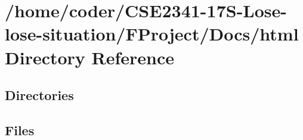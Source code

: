 \section{/home/coder/\+C\+S\+E2341-\/17\+S-\/\+Lose-\/lose-\/situation/\+F\+Project/\+Docs/html Directory Reference}
\label{dir_1db84d1af81ec941ad0c5d401eba4310}
\subsection*{Directories}
\begin{DoxyCompactItemize}
\end{DoxyCompactItemize}
\subsection*{Files}
\begin{DoxyCompactItemize}
\end{DoxyCompactItemize}
